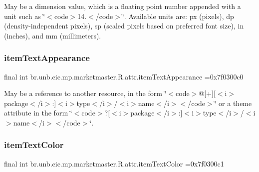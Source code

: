 May be a dimension value, which is a floating point number appended with a unit such as \char`\"{}$<$code$>$14.\+5sp$<$/code$>$\char`\"{}. Available units are\+: px (pixels), dp (density-\/independent pixels), sp (scaled pixels based on preferred font size), in (inches), and mm (millimeters). \mbox{\label{classbr_1_1unb_1_1cic_1_1mp_1_1marketmaster_1_1R_1_1attr_a9162b72b8494052fd9158c7173094c33}} 
\subsubsection{\texorpdfstring{item\+Text\+Appearance}{itemTextAppearance}}
{\footnotesize\ttfamily final int br.\+unb.\+cic.\+mp.\+marketmaster.\+R.\+attr.\+item\+Text\+Appearance =0x7f0300c0\hspace{0.3cm}{\ttfamily [static]}}

May be a reference to another resource, in the form \char`\"{}$<$code$>$@\mbox{[}+\mbox{]}\mbox{[}$<$i$>$package$<$/i$>$\+:\mbox{]}$<$i$>$type$<$/i$>$/$<$i$>$name$<$/i$>$$<$/code$>$\char`\"{} or a theme attribute in the form \char`\"{}$<$code$>$?\mbox{[}$<$i$>$package$<$/i$>$\+:\mbox{]}$<$i$>$type$<$/i$>$/$<$i$>$name$<$/i$>$$<$/code$>$\char`\"{}. \mbox{\label{classbr_1_1unb_1_1cic_1_1mp_1_1marketmaster_1_1R_1_1attr_a5e019861bdd59c877c3657d5c8f95d6f}} 
\subsubsection{\texorpdfstring{item\+Text\+Color}{itemTextColor}}
{\footnotesize\ttfamily final int br.\+unb.\+cic.\+mp.\+marketmaster.\+R.\+attr.\+item\+Text\+Color =0x7f0300c1\hspace{0.3cm}{\ttfamily [static]}}

